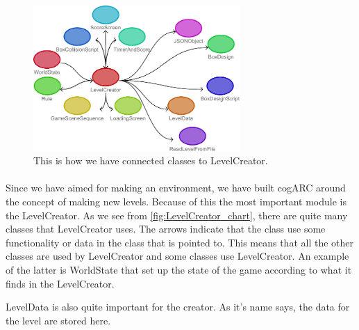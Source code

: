 
\begin{figure}[b!]
	\capstart
	\centering
	\includegraphics[width=0.7\textwidth]{images/LevelCreator_class_connectivity}
	\caption[LevelCreator class chart]{This is how we have connected classes to LevelCreator.}
	\label{fig:LevelCreator_chart}
\end{figure}


\paragraph{}
Since we have aimed for making an environment, we have built cogARC around 
the concept of making new levels. Because of this the most important module 
is the LevelCreator. As we see from \autoref{fig:LevelCreator_chart}, there
are quite many classes that LevelCreator uses.
The arrows indicate that the class use some functionality or data in the 
class that is pointed to. This means that all the other classes are used by
LevelCreator and some classes use LevelCreator. An example of the latter is 
WorldState that set up the state of the game according to what it finds in the
LevelCreator.

LevelData is also quite important for the creator. As it's name says, the data
for the level are stored here.




